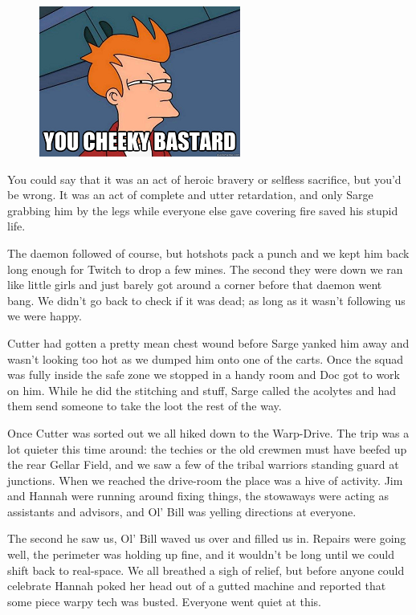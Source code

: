 \begin{figure}
	\begin{center}
		\includegraphics[width=\figwidth]{pics/7/35.png}
	\end{center}
\end{figure}
You could say that it was an act of heroic bravery or selfless sacrifice, but you’d be wrong. 
It was an act of complete and utter retardation, and only Sarge grabbing him by the legs while everyone else gave covering fire saved his stupid life.

The daemon followed of course, but hotshots pack a punch and we kept him back long enough for Twitch to drop a few mines. 
The second they were down we ran like little girls and just barely got around a corner before that daemon went bang. 
We didn’t go back to check if it was dead; 
as long as it wasn’t following us we were happy.

Cutter had gotten a pretty mean chest wound before Sarge yanked him away and wasn’t looking too hot as we dumped him onto one of the carts. 
Once the squad was fully inside the safe zone we stopped in a handy room and Doc got to work on him. 
While he did the stitching and stuff, Sarge called the acolytes and had them send someone to take the loot the rest of the way.

Once Cutter was sorted out we all hiked down to the Warp-Drive. 
The trip was a lot quieter this time around: 
the techies or the old crewmen must have beefed up the rear Gellar Field, and we saw a few of the tribal warriors standing guard at junctions. 
When we reached the drive-room the place was a hive of activity. 
Jim and Hannah were running around fixing things, the stowaways were acting as assistants and advisors, and Ol’ Bill was yelling directions at everyone.

The second he saw us, Ol’ Bill waved us over and filled us in. 
Repairs were going well, the perimeter was holding up fine, and it wouldn’t be long until we could shift back to real-space. 
We all breathed a sigh of relief, but before anyone could celebrate Hannah poked her head out of a gutted machine and reported that some piece warpy tech was busted. 
Everyone went quiet at this. 


